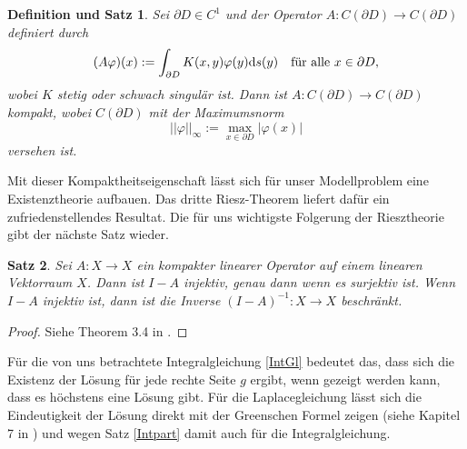 \documentclass[12pt,a4paper]{scrartcl}
\newtheorem{Satz}{Satz}[section]
\newtheorem{DefSatz}[Satz]{Definition und Satz}
\newcommand{\dd}{\mathrm{d}}
\numberwithin{equation}{section}
\newcommand{\fa}{\text{\quad für alle }}
\begin{document}
\begin{DefSatz}
Sei $\partial D \in C^1$ und der Operator $A:C(\partial D) \to C( \partial D)$ definiert durch 
\[
	(A \varphi)(x) := \int_{\partial D} K(x,y) \varphi (y) \dd s(y) \fa x\in \partial D,
\]
wobei $K$ stetig oder schwach singulär ist. Dann ist $A:C(\partial D) \to C( \partial D)$ kompakt, wobei $C(\partial D)$ mit der Maximumsnorm 
\[
	||\varphi ||_\infty := \max_{x\in \partial D} |\varphi (x) |
\]
versehen ist.
\end{DefSatz} 
Mit dieser Kompaktheitseigenschaft lässt sich für unser Modellproblem eine Existenztheorie aufbauen. Das dritte Riesz-Theorem liefert dafür ein zufriedenstellendes Resultat. Die für uns wichtigste Folgerung der Riesztheorie gibt der nächste Satz wieder.
\begin{Satz}
  Sei $A:X \to X$ ein kompakter linearer Operator auf einem linearen Vektorraum $X$. Dann ist $I-A$ injektiv, genau dann wenn es surjektiv ist. Wenn $I-A$ injektiv ist, dann ist die Inverse $(I-A)^{-1}:X \to X$ beschränkt.
\end{Satz}  
\begin{proof}
Siehe Theorem 3.4 in \cite{kress}.
\end{proof}

Für die von uns betrachtete Integralgleichung \eqref{IntGl} bedeutet das, dass sich die Existenz der Lösung für jede rechte Seite $g$ ergibt, wenn gezeigt werden kann, dass es höchstens eine Lösung gibt. Für die Laplacegleichung lässt sich die Eindeutigkeit der Lösung direkt mit der Greenschen Formel zeigen (siehe Kapitel 7 in \cite{kress}) und wegen Satz \ref{Intpart} damit auch für die Integralgleichung.
    
\end{document}
